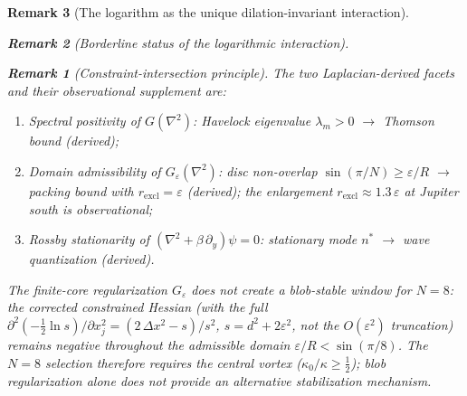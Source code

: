 \documentclass[12pt, a4paper]{article}
\newtheorem{remark}{Remark}[section]
\numberwithin{equation}{section}
\begin{document}
\begin{remark}[The logarithm as the unique dilation-invariant interaction]
\begin{remark}[Borderline status of the logarithmic interaction]
\begin{remark}[Constraint-intersection principle]
The two Laplacian-derived facets and their observational supplement are:
\begin{enumerate}
  \item \emph{Spectral positivity} of $G(\nabla^2)$: Havelock
    eigenvalue $\lambda_m > 0$ $\to$ Thomson bound (derived);
  \item \emph{Domain admissibility} of $G_\varepsilon(\nabla^2)$:
    disc non-overlap $\sin(\pi/N) \ge \varepsilon/R$ $\to$ packing
    bound with $r_{\mathrm{excl}} = \varepsilon$ (derived);
    the enlargement $r_{\mathrm{excl}} \approx 1.3\,\varepsilon$
    at Jupiter south is observational;
  \item \emph{Rossby stationarity} of $(\nabla^2 + \beta\,\partial_y)\psi = 0$:
    stationary mode $n^*$ $\to$ wave quantization (derived).
\end{enumerate}
The finite-core regularization $G_\varepsilon$ does \emph{not} create
a blob-stable window for $N = 8$: the corrected constrained Hessian
(with the full $\partial^2(-\tfrac12\ln s)/\partial x_j^2
= (2\,\Delta x^2 - s)/s^2$, $s = d^2 + 2\varepsilon^2$, not
the $O(\varepsilon^2)$ truncation) remains negative throughout
the admissible domain $\varepsilon/R < \sin(\pi/8)$.
The $N = 8$ selection therefore requires the central vortex
($\kappa_0/\kappa \ge \tfrac{1}{2}$); blob regularization alone
does not provide an alternative stabilization mechanism.
\end{remark}


\end{remark}
\end{remark}
\end{document}
